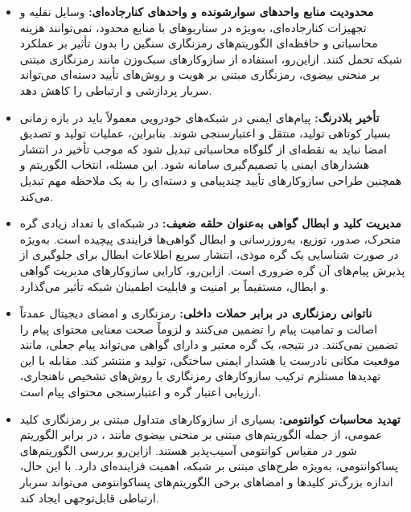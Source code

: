 \documentclass[12pt,a4paper]{article}
\begin{document}
\begin{itemize}

\item \textbf{محدودیت منابع واحدهای سوارشونده و واحدهای کنارجاده‌ای:} وسایل نقلیه و تجهیزات کنارجاده‌ای، به‌ویژه در سناریوهای با منابع محدود، نمی‌توانند هزینه محاسباتی و حافظه‌ای الگوریتم‌های رمزنگاری سنگین را بدون تأثیر بر عملکرد شبکه تحمل کنند. ازاین‌رو، استفاده از سازوکارهای سبک‌وزن مانند رمزنگاری مبتنی بر منحنی بیضوی، رمزنگاری مبتنی بر هویت و روش‌های تأیید دسته‌ای می‌تواند سربار پردازشی و ارتباطی را کاهش دهد.

\item \textbf{تأخیر بلادرنگ:} پیام‌های ایمنی در شبکه‌های خودرویی معمولاً باید در بازه زمانی بسیار کوتاهی تولید، منتقل و اعتبارسنجی شوند. بنابراین، عملیات تولید و تصدیق امضا نباید به نقطه‌ای از گلوگاه محاسباتی تبدیل شود که موجب تأخیر در انتشار هشدارهای ایمنی یا تصمیم‌گیری سامانه شود. این مسئله، انتخاب الگوریتم و همچنین طراحی سازوکارهای تأیید چندپیامی و دسته‌ای را به یک ملاحظه مهم تبدیل می‌کند.

\item \textbf{مدیریت کلید و ابطال گواهی به‌عنوان حلقه ضعیف:} در شبکه‌ای با تعداد زیادی گره متحرک، صدور، توزیع، به‌روزرسانی و ابطال گواهی‌ها فرایندی پیچیده است. به‌ویژه در صورت شناسایی یک گره موذی، انتشار سریع اطلاعات ابطال برای جلوگیری از پذیرش پیام‌های آن گره ضروری است. ازاین‌رو، کارایی سازوکارهای مدیریت گواهی و ابطال، مستقیماً بر امنیت و قابلیت اطمینان شبکه تأثیر می‌گذارد.

\item \textbf{ناتوانی رمزنگاری در برابر حملات داخلی:} رمزنگاری و امضای دیجیتال عمدتاً اصالت و تمامیت پیام را تضمین می‌کنند و لزوماً صحت معنایی محتوای پیام را تضمین نمی‌کنند. در نتیجه، یک گره معتبر و دارای گواهی می‌تواند پیام جعلی، مانند موقعیت مکانی نادرست یا هشدار ایمنی ساختگی، تولید و منتشر کند. مقابله با این تهدیدها مستلزم ترکیب سازوکارهای رمزنگاری با روش‌های تشخیص ناهنجاری، ارزیابی اعتبار گره و اعتبارسنجی محتوای پیام است.

\item \textbf{تهدید محاسبات کوانتومی:} بسیاری از سازوکارهای متداول مبتنی بر رمزنگاری کلید عمومی، از جمله الگوریتم‌های مبتنی بر منحنی بیضوی مانند ، در برابر الگوریتم شور در مقیاس کوانتومی آسیب‌پذیر هستند. ازاین‌رو بررسی الگوریتم‌های پساکوانتومی، به‌ویژه طرح‌های مبتنی بر شبکه، اهمیت فزاینده‌ای دارد. با این حال، اندازه بزرگ‌تر کلیدها و امضاهای برخی الگوریتم‌های پساکوانتومی می‌تواند سربار ارتباطی قابل‌توجهی ایجاد کند.


\end{itemize}
\end{document}
